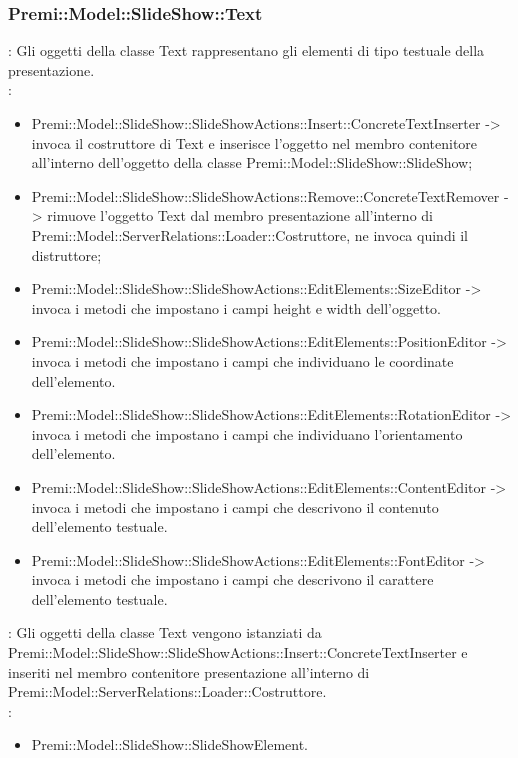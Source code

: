 {     \subsubsection{Premi::Model::SlideShow::Text}{
				\textbf{\tipo}: Gli oggetti della classe Text rappresentano gli elementi di tipo testuale della presentazione.\\
				\textbf{\relaz}: 
				\begin{itemize}
					\item Premi::Model::SlideShow::SlideShowActions::Insert::ConcreteTextInserter -> invoca il costruttore di Text e inserisce l’oggetto nel membro contenitore all’interno dell’oggetto della classe Premi::Model::SlideShow::SlideShow;
                    \item Premi::Model::SlideShow::SlideShowActions::Remove::ConcreteTextRemover -> rimuove l’oggetto Text dal membro presentazione all’interno di Premi::Model::ServerRelations::Loader::Costruttore, ne invoca quindi il distruttore;
                    \item Premi::Model::SlideShow::SlideShowActions::EditElements::SizeEditor -> invoca i metodi che impostano i campi height e width dell'oggetto.
                    \item Premi::Model::SlideShow::SlideShowActions::EditElements::PositionEditor -> invoca i metodi che impostano i campi che individuano le coordinate dell'elemento.
                    \item Premi::Model::SlideShow::SlideShowActions::EditElements::RotationEditor -> invoca i metodi che impostano i campi che individuano l'orientamento dell'elemento.
                    \item Premi::Model::SlideShow::SlideShowActions::EditElements::ContentEditor -> invoca i metodi che impostano i campi che descrivono il contenuto dell'elemento testuale.
                    \item Premi::Model::SlideShow::SlideShowActions::EditElements::FontEditor -> invoca i metodi che impostano i campi che descrivono il carattere dell'elemento testuale.
				\end{itemize}	
                \textbf{\interfacce}: Gli oggetti della classe Text vengono istanziati da Premi::Model::SlideShow::SlideShowActions::Insert::ConcreteTextInserter e inseriti nel membro contenitore presentazione all’interno di Premi::Model::ServerRelations::Loader::Costruttore.\\
                \textbf{\base}: 
                    \begin{itemize}
                    \item Premi::Model::SlideShow::SlideShowElement.
                    \end{itemize}
                    }
}
